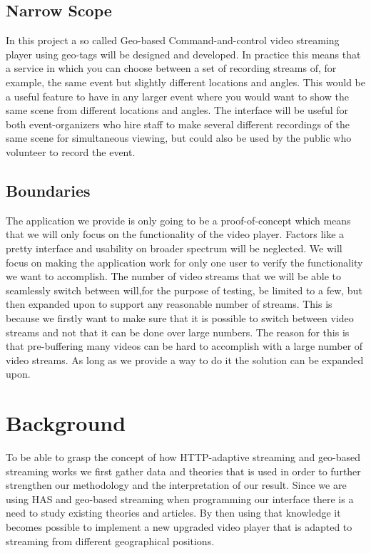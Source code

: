 \documentclass[9pt,a4paper]{acmproc}
\begin{document}
\subsection{Narrow Scope}
In this project a so called Geo-based Command-and-control video streaming player using geo-tags will be designed and developed. In practice this means that a service in which you can choose between a set of recording streams of, for example, the same event but slightly different locations and angles. This would be a useful feature to have in any larger event where you would want to show the same scene from different locations and angles. The interface will be useful for both event-organizers who hire staff to make several different recordings of the same scene for simultaneous viewing, but could also be used by the public who volunteer to record the event.

\subsection{Boundaries}
The application we provide is only going to be a proof-of-concept which means that we will only focus on the functionality of the video player. Factors like a pretty interface and usability on broader spectrum will be neglected. We will focus on making the application work for only one user to verify the functionality we want to accomplish. The number of video streams that we will be able to seamlessly switch between will,for the purpose of testing, be limited to a few, but then expanded upon to support any reasonable number of streams. This is because we firstly want to make sure that it is possible to switch between video streams and not that it can be done over large numbers. The reason for this is that pre-buffering many videos can be hard to accomplish with a large number of video streams. As long as we provide a way to do it the solution can be expanded upon.


\section{Background}
To be able to grasp the concept of how HTTP-adaptive streaming and geo-based streaming works we first gather data and theories that is used in order to further strengthen our methodology and the interpretation of our result. Since we are using HAS and geo-based streaming when programming our interface there is a need to study existing theories and articles. By then using that knowledge it becomes possible to implement a new upgraded video player that is adapted to streaming from different geographical positions.
\end{document}
